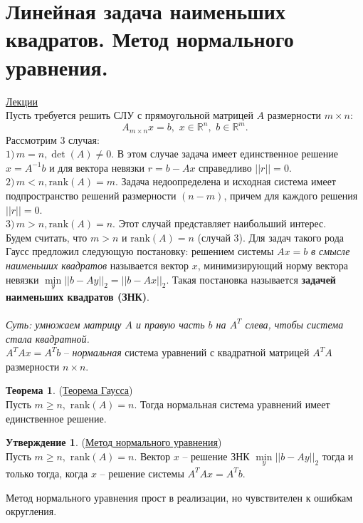 \documentclass[specialist, subf, href, colorlinks=true, 12pt, times, mtpro, final]{disser}
\theoremstyle{definition}
\newtheorem{state}{Утверждение}[section]
\newtheorem{theorem}{Теорема}[section]
\def\rk{\text{rank}}
\begin{document}
{\section {Линейная задача наименьших квадратов. Метод нормального уравнения.}
    \hyperlink {lects.71}{Лекции}\\
    Пусть требуется решить СЛУ с прямоугольной матрицей $A$ размерности $m\times n$:
    $$
        A_{m\times n} x = b, \,\, x\in \mathds{R}^n, \,\, b \in \mathds{R}^m.
    $$
    Рассмотрим 3 случая:\\
    $1)\, m = n, \det(A) \ne 0.$ В этом случае задача имеет единственное решение
    $x = A^{-1}b$ и для вектора невязки $r = b - Ax$ справедливо $||r|| = 0$.\\
    $2)\, m < n, \rk(A) = m.$ Задача недоопределена и исходная система имеет подпространство решений размерности $(n - m)$, причем для каждого решения $||r|| = 0$.\\
    $3)\, m > n, \rk(A) = n.$ Этот случай представляет наибольший интерес.\\
    Будем считать, что $m>n$ и $\rk(A) = n$ (случай 3). Для задач такого рода Гаусс предложил следующую постановку: решением системы $Ax=b$ {\it в смысле наименьших
    квадратов} называется вектор $x$, минимизирующий норму вектора невязки
    $\min\limits_{y}||b - Ay||_2 = ||b - Ax||_2$. Такая постановка называется
    {\bf задачей наименьших квадратов (ЗНК)}.\\
    \\
    {\it Суть: умножаем матрицу $A$ и правую часть $b$ на $A^T$ слева, чтобы система стала квадратной.}\\
    $A^T Ax = A^T b$ -- {\it нормальная} система уравнений с квадратной матрицей $A^T A$
    размерности $n\times n$.
    \begin{theorem} (\hyperlink {lects.71}{Теорема Гаусса})\\
    Пусть $m \ge n, \,\, \rk(A) = n$. Тогда нормальная система уравнений имеет единственное
    решение.
    \end{theorem}
    \begin{state} (\hyperlink {lects.71}{Метод нормального уравнения})\\
    Пусть $m \ge n, \,\, \rk(A) = n$. Вектор $x$ -- решение ЗНК $\min\limits_{y}||b-Ay||_2$
    тогда и только тогда, когда $x$ -- решение системы $A^T Ax = A^T b$.
    \end{state}
    Метод нормального уравнения прост в реализации, но чувствителен к ошибкам округления.

}
\end{document}
